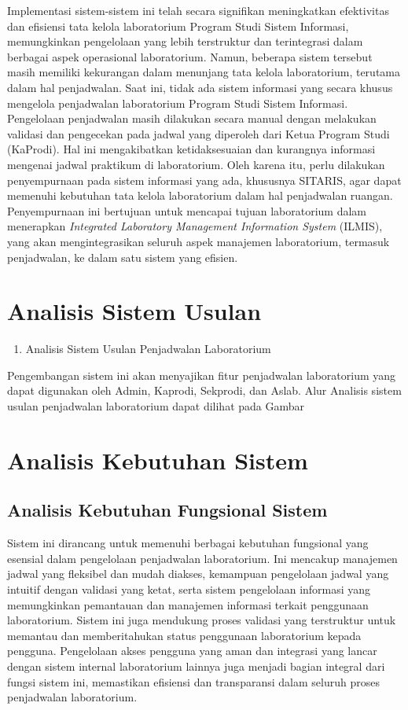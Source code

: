 Implementasi sistem-sistem ini telah secara signifikan meningkatkan efektivitas dan efisiensi tata kelola laboratorium Program Studi Sistem Informasi, memungkinkan pengelolaan yang lebih terstruktur dan terintegrasi dalam berbagai aspek operasional laboratorium. Namun, beberapa sistem tersebut masih memiliki kekurangan dalam menunjang tata kelola laboratorium, terutama dalam hal penjadwalan. Saat ini, tidak ada sistem informasi yang secara khusus mengelola penjadwalan laboratorium Program Studi Sistem Informasi. Pengelolaan penjadwalan masih dilakukan secara manual dengan melakukan validasi dan pengecekan pada jadwal yang diperoleh dari Ketua Program Studi (KaProdi). Hal ini mengakibatkan ketidaksesuaian dan kurangnya informasi mengenai jadwal praktikum di laboratorium. Oleh karena itu, perlu dilakukan penyempurnaan pada sistem informasi yang ada, khususnya SITARIS, agar dapat memenuhi kebutuhan tata kelola laboratorium dalam hal penjadwalan ruangan. Penyempurnaan ini bertujuan untuk mencapai tujuan laboratorium dalam menerapkan \textit{Integrated Laboratory Management Information System} (ILMIS), yang akan mengintegrasikan seluruh aspek manajemen laboratorium, termasuk penjadwalan, ke dalam satu sistem yang efisien.

\section{Analisis Sistem Usulan}
\begin{enumerate}
	\item Analisis Sistem Usulan Penjadwalan Laboratorium
\end{enumerate}
Pengembangan sistem ini akan menyajikan fitur penjadwalan laboratorium yang dapat digunakan oleh Admin, Kaprodi, Sekprodi, dan Aslab. Alur Analisis sistem usulan penjadwalan laboratorium dapat dilihat pada Gambar

\section{Analisis Kebutuhan Sistem}
\subsection{Analisis Kebutuhan Fungsional Sistem}
Sistem ini dirancang untuk memenuhi berbagai kebutuhan fungsional yang esensial dalam pengelolaan penjadwalan laboratorium. Ini mencakup manajemen jadwal yang fleksibel dan mudah diakses, kemampuan pengelolaan jadwal yang intuitif dengan validasi yang ketat, serta sistem pengelolaan informasi yang memungkinkan pemantauan dan manajemen informasi terkait penggunaan laboratorium. Sistem ini juga mendukung proses validasi yang terstruktur  untuk memantau dan memberitahukan status penggunaan laboratorium kepada pengguna. Pengelolaan akses pengguna yang aman dan integrasi yang lancar dengan sistem internal laboratorium lainnya juga menjadi bagian integral dari fungsi sistem ini, memastikan efisiensi dan transparansi dalam seluruh proses penjadwalan laboratorium.

